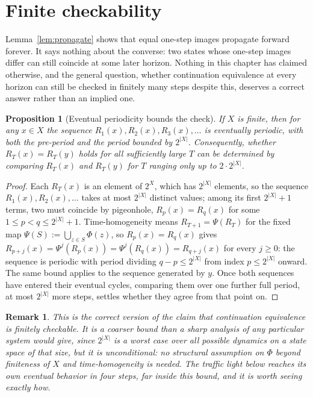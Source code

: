 \documentclass[11pt]{report}
\newtheorem{proposition}{Proposition}[chapter]
\newtheorem{remark}{Remark}[chapter]
\begin{document}
\section*{Finite checkability}

Lemma~\ref{lem:propagate} shows that equal one-step images propagate
forward forever. It says nothing about the converse: two states whose
one-step images differ can still coincide at some later horizon.
Nothing in this chapter has claimed otherwise, and the general
question, whether continuation equivalence at every horizon can still
be checked in finitely many steps despite this, deserves a correct
answer rather than an implied one.

\begin{proposition}[Eventual periodicity bounds the check]
\label{prop:periodicity}
If $X$ is finite, then for any $x \in X$ the sequence
$R_1(x), R_2(x), R_3(x), \dots$ is eventually periodic, with both the
pre-period and the period bounded by $2^{|X|}$. Consequently, whether
$R_T(x) = R_T(y)$ holds for all sufficiently large $T$ can be
determined by comparing $R_T(x)$ and $R_T(y)$ for $T$ ranging only up
to $2 \cdot 2^{|X|}$.
\end{proposition}
\begin{proof}
Each $R_T(x)$ is an element of $2^X$, which has $2^{|X|}$ elements, so
the sequence $R_1(x), R_2(x), \dots$ takes at most $2^{|X|}$ distinct
values; among its first $2^{|X|}+1$ terms, two must coincide by
pigeonhole, $R_p(x) = R_q(x)$ for some $1 \leq p < q \leq 2^{|X|}+1$.
Time-homogeneity means $R_{T+1} = \Psi(R_T)$ for the fixed map
$\Psi(S) := \bigcup_{z \in S} \Phi(z)$, so $R_p(x) = R_q(x)$ gives
$R_{p+j}(x) = \Psi^j(R_p(x)) = \Psi^j(R_q(x)) = R_{q+j}(x)$ for every
$j \geq 0$: the sequence is periodic with period dividing $q - p \leq
2^{|X|}$ from index $p \leq 2^{|X|}$ onward. The same bound applies to
the sequence generated by $y$. Once both sequences have entered their
eventual cycles, comparing them over one further full period, at most
$2^{|X|}$ more steps, settles whether they agree from that point on.
\end{proof}

\begin{remark}
This is the correct version of the claim that continuation
equivalence is finitely checkable. It is a coarser bound than a sharp
analysis of any particular system would give, since $2^{|X|}$ is a
worst case over all possible dynamics on a state space of that size,
but it is unconditional: no structural assumption on $\Phi$ beyond
finiteness of $X$ and time-homogeneity is needed. The traffic light
below reaches its own eventual behavior in four steps, far inside this
bound, and it is worth seeing exactly how.
\end{remark}
\end{document}
